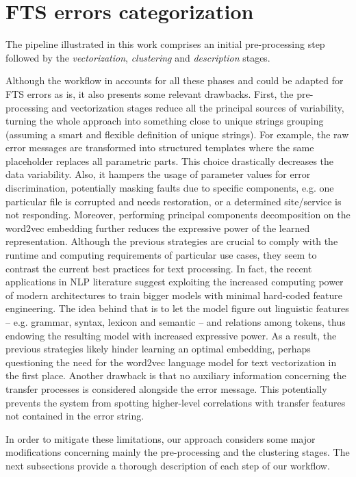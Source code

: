 \section{FTS errors categorization} \label{sec:pipeline}

The pipeline illustrated in this work comprises an initial pre-processing step followed by the \textit{vectorization}, \textit{clustering} and \textit{description} stages.

Although the workflow in
 accounts for all these phases and could be adapted for FTS errors as is, it also presents some relevant drawbacks.
First, the pre-processing and vectorization stages reduce all the principal sources of variability, turning the whole approach into something close to unique strings grouping (assuming a smart and flexible definition of unique strings). 
For example,  the raw error messages are transformed into structured templates where the same placeholder replaces all parametric parts.
This choice drastically decreases the data variability. Also, it hampers the usage of parameter values for error discrimination, potentially masking faults due to specific components, e.g. one particular file is corrupted and needs restoration, or a determined site/service is not responding.
Moreover, performing principal components decomposition on the word2vec embedding further reduces the expressive power of the learned representation.
Although the previous strategies are crucial to comply with the runtime and computing requirements of particular use cases, they seem to contrast the current best practices for text processing. 
In fact,  the recent applications in NLP literature suggest exploiting the increased computing power of modern architectures to train bigger models with minimal hard-coded feature engineering. 
The idea behind that is to let the model figure out linguistic features -- e.g. grammar, syntax, lexicon and semantic -- and relations among tokens, thus endowing the resulting model with increased expressive power.
As a result, the previous strategies likely hinder learning an optimal embedding, perhaps questioning the need for the word2vec language model for text vectorization in the first place.
Another drawback is that no auxiliary information concerning the transfer processes is considered alongside the error message. This potentially prevents the system from spotting higher-level correlations with transfer features not contained in the error string.

In order to mitigate these limitations, our approach considers some major modifications concerning mainly the pre-processing and the clustering stages.
The next subsections provide a thorough description of each step of our workflow.%





